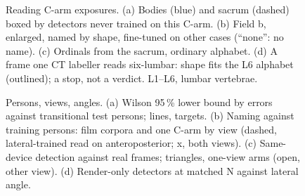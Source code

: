 \begin{figure}[tbh!]
\centering
{}
\caption{Reading C-arm exposures. (a) Bodies (blue) and sacrum (dashed) boxed by detectors never trained on this C-arm. (b) Field b, enlarged, named by shape, fine-tuned on other cases (``none'': no name). (c) Ordinals from the sacrum, ordinary alphabet. (d) A frame one CT labeller reads six-lumbar: shape fits the L6 alphabet (outlined); a stop, not a verdict. L1--L6, lumbar vertebrae.\label{fig:exposure}}
\end{figure}

\begin{figure}[tbh!]
\centering
{}
\caption{Persons, views, angles. (a) Wilson 95\,\% lower bound by errors against transitional test persons; lines, targets. (b) Naming against training persons: film corpora and one C-arm by view (dashed, lateral-trained read on anteroposterior; x, both views). (c) Same-device detection against real frames; triangles, one-view arms (open, other view). (d) Render-only detectors at matched N against lateral angle.\label{fig:power}}
\end{figure}

